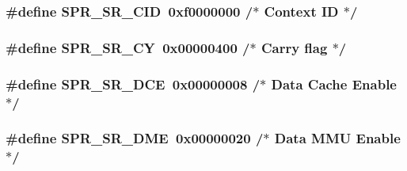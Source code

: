 \hypertarget{spr-defs_8h_a096dc749a65a60551e151c94ab58be3d}{
\subsubsection[{\-S\-P\-R\-\_\-\-S\-R\-\_\-\-C\-I\-D}]{\setlength{\rightskip}{0pt plus 5cm}\#define {\bf \-S\-P\-R\-\_\-\-S\-R\-\_\-\-C\-I\-D}~0xf0000000  /$\ast$ Context I\-D $\ast$/}}\label{spr-defs_8h_a096dc749a65a60551e151c94ab58be3d}
\hypertarget{spr-defs_8h_a40a3ea6050feb4a29c74b198bb86e46d}{
\subsubsection[{\-S\-P\-R\-\_\-\-S\-R\-\_\-\-C\-Y}]{\setlength{\rightskip}{0pt plus 5cm}\#define {\bf \-S\-P\-R\-\_\-\-S\-R\-\_\-\-C\-Y}~0x00000400  /$\ast$ Carry flag $\ast$/}}\label{spr-defs_8h_a40a3ea6050feb4a29c74b198bb86e46d}
\hypertarget{spr-defs_8h_a1f790320f4575155698f958a4119480a}{
\subsubsection[{\-S\-P\-R\-\_\-\-S\-R\-\_\-\-D\-C\-E}]{\setlength{\rightskip}{0pt plus 5cm}\#define {\bf \-S\-P\-R\-\_\-\-S\-R\-\_\-\-D\-C\-E}~0x00000008  /$\ast$ Data Cache Enable $\ast$/}}\label{spr-defs_8h_a1f790320f4575155698f958a4119480a}
\hypertarget{spr-defs_8h_a44317b89a91ff1658d8b3b342e40b88e}{
\subsubsection[{\-S\-P\-R\-\_\-\-S\-R\-\_\-\-D\-M\-E}]{\setlength{\rightskip}{0pt plus 5cm}\#define {\bf \-S\-P\-R\-\_\-\-S\-R\-\_\-\-D\-M\-E}~0x00000020  /$\ast$ Data M\-M\-U Enable $\ast$/}}\label{spr-defs_8h_a44317b89a91ff1658d8b3b342e40b88e}
